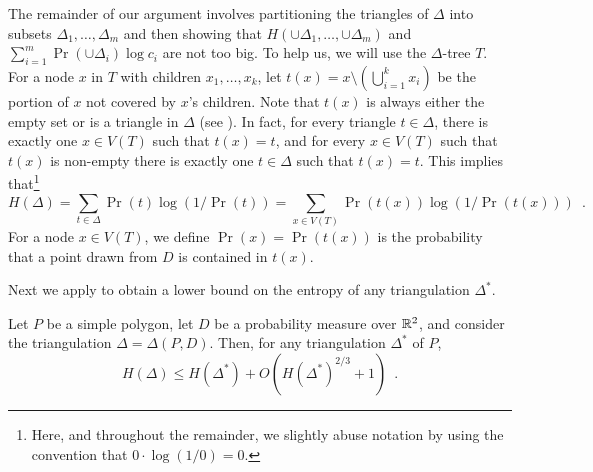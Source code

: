 \documentclass[lotsofwhite]{patmorin}
\begin{document}
The remainder of our argument involves partitioning the triangles of
$\Delta$ into subsets $\Delta_1,\ldots,\Delta_m$ and then showing that
$H(\cup\Delta_1,\ldots,\cup\Delta_m)$ and $\sum_{i=1}^m \Pr(\cup\Delta_i)\log
c_i$ are not too big.  To help us, we will use the $\Delta$-tree $T$.
For a node $x$ in $T$ with children $x_1,\ldots,x_k$, let $t(x) = x
\setminus (\bigcup_{i=1}^k x_i)$ be the portion of $x$ not covered by
$x$'s children.  Note that $t(x)$ is always either the empty set or is
a triangle in $\Delta$ (see ).  In fact, for every
triangle $t\in\Delta$, there is exactly one $x\in V(T)$ such that
$t(x)=t$, and for every $x\in V(T)$ such that $t(x)$ is non-empty
there is exactly one $t\in\Delta$ such that $t(x)=t$.  This implies
that\footnote{Here, and throughout the remainder, we slightly abuse
notation by using the convention that $0\cdot\log(1/0)=0$.}
\[
    H(\Delta) = \sum_{t\in\Delta}\Pr(t)\log(1/\Pr(t)) =
       \sum_{x\in V(T)}\Pr(t(x))\log(1/\Pr(t(x))) \enspace .
\]
For a node $x\in V(T)$, we define $\Pr(x)=\Pr(t(x))$ is the
probability that a point drawn from $D$ is contained in $t(x)$.

Next we apply  to obtain a lower bound on the
entropy of any triangulation $\Delta^*$. 

\begin{lem}
Let $P$ be a simple polygon, let $D$ be a probability measure over
$\mathbb{R}^2$, and consider the triangulation $\Delta=\Delta(P,D)$.
Then, for any triangulation $\Delta^*$ of $P$,
\[
    H(\Delta) \le H(\Delta^*) + O(H(\Delta^*)^{2/3}+1) \enspace .
\]
\end{lem}
\end{document}
